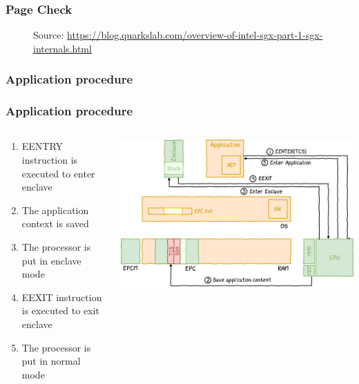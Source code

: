 \begin{frame}
    \frametitle{Page Check}
    \begin{figure}
        \centering
        \caption*{Source: \url{https://blog.quarkslab.com/overview-of-intel-sgx-part-1-sgx-internals.html}}
    \end{figure}
\end{frame}

\begin{frame}
    \frametitle{Application procedure}

\end{frame}

\begin{frame}
    \frametitle{Application procedure}
    \begin{columns}
        \begin{column}{0.3\textwidth}
           \begin{enumerate}[<+->]
               \item EENTRY instruction is executed to enter enclave
               \item The application context is saved
               \item The processor is put in enclave mode
               \item EEXIT instruction is executed to exit enclave
               \item The processor is put in normal mode
           \end{enumerate}
        \end{column}
        \begin{column}{0.7\textwidth}
            \begin{center}
                \includegraphics[scale=0.35]{Images/procedure.png}
            \end{center}
        \end{column}
        \end{columns}
\end{frame}

